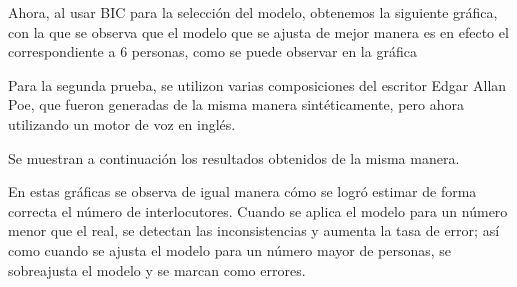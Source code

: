 Ahora, al usar BIC para la selección del modelo, obtenemos la siguiente gráfica, con la que se observa que el modelo que se ajusta de mejor manera es en efecto el correspondiente a 6 personas, como se puede observar en la gráfica 

Para la segunda prueba, se utilizon varias composiciones del escritor Edgar Allan Poe, que fueron generadas de la misma manera sintéticamente, pero ahora utilizando un motor de voz en inglés.

Se muestran a continuación los resultados obtenidos de la misma manera.

En estas gráficas se observa de igual manera cómo se logró estimar de forma correcta el número de interlocutores. Cuando se aplica el modelo para un número menor que el real, se detectan las inconsistencias y aumenta la tasa de error; así como cuando se ajusta el modelo para un número mayor de personas, se sobreajusta el modelo y se marcan como errores.



